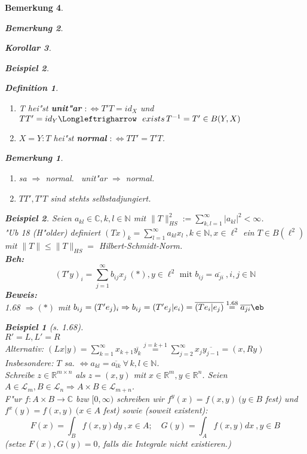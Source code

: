 \documentclass[a4paper,11pt]{book}
\newcommand{\R}{{\mathbb R}}
\newcommand{\C}{{\mathbb C}}
\newcommand{\N}{{\mathbb N}}
\newcommand{\ssL}{{\mathcal L}}
\newcommand{\begriff}[1]{\textbf{#1}} %
\newtheorem{Def}{Definition}[chapter]
\newtheorem{Kor}[Def]{Korollar}
\newtheorem*{BspNO}{Beispiel}
\newtheorem{Bsp}[Def]{Beispiel}
\newtheorem*{BemNO}{Bemerkung}
\newtheorem{Bem}[Def]{Bemerkung}
\theoremstyle{nonumberplain}
\begin{document}
\begin{Bem}
\begin{BemNO}
\begin{Kor}
\begin{BspNO}
\begin{enumerate}
\begin{Def}
\begin{enumerate}
\item[b)] T hei"st \begriff{unit"ar} $: \Longleftrightarrow T'T = id_X$ und $TT' = id_Y \Longleftrigharrow \ \ exists\, T^{-1} = T' \in B(Y,X)$

\item[c)] $X = Y: T$ hei"st \begriff{normal} $: \Longleftrightarrow TT' = T'T$.
\end{enumerate}
\end{Def}


\begin{BemNO}
\begin{enumerate}
\item sa $\Rightarrow$ normal. \ unit"ar $\Rightarrow$ normal.

\item $TT', T'T$ sind stehts selbstadjungiert.
\end{enumerate}
\end{BemNO}


\begin{Bsp}
Seien $a_{kl} \in \C, k,l \in \N$ mit $\|T\|_{HS}^2 := \sum_{k,l = 1}^{\infty} |a_{kl}|^2 < \infty$.\\
"Ub 18 (H"older) definiert $(Tx)_k = \sum_{l=1}^{\infty} a_{kl}x_l \ , k \in \N, x \in \ell^2$ ein $T \in B(\ell^2)$ mit $\|T\| \leq \|T\|_{HS} = $ Hilbert-Schmidt-Norm.\\
\textbf{Beh:}
\[
(T'y)_i = \sum_{j=1}^{\infty} b_{ij}x_j \ (\ast), y \in \ell^2 \text{  mit } b_{ij} = \overline{a_{ji}} \ ,i,j \in \N
\]
\textbf{Beweis:}\\
1.68 $\Rightarrow (\ast)$ mit $b_{ij} = (T'e_j)_i \Rightarrow b_{ij} = (T'e_j|e_i) = \overline{(Te_i|e_j)} \stackrel{1.68}{=} \overline{a_{ji}} \eb$
\end{Bsp}


\begin{BspNO}[s. 1.68]\\
$R' = L, L' = R$\\
Alternativ: $(Lx|y) = \sum_{k=1}^{\infty} x_{k+1} \overline{y_k} \stackrel{j=k+1}{=} \sum_{j=2}^{\infty} x_j \overline{y_{j-1}} = (x,Ry)$\\
Insbesondere: $T$ sa. $\Longleftrightarrow a_{kl} = \overline{a_{lk}} \ \forall\, k,l \in \N$.\\
Schreibe $z \in \R^{m \times n}$ als $z = (x,y)$ mit $x \in \R^m, y \in \R^n$. Seien $A \in \ssL_m, B \in \ssL_n \Rightarrow A \times B \in \ssL_{m+n}$.\\
F"ur $f: A \times B \rightarrow \C$ bzw $[0,\infty)$ schreiben wir $f^y(x) = f(x,y) \ (y \in B$ fest) und $f^x(y) = f(x,y) \ (x \in A$ fest) sowie (soweit existent):
\[
F(x) = \int_B f(x,y)dy \ , x \in A; \quad G(y) = \int_A f(x,y)dx \ , y \in B
\]
(setze $F(x),G(y) = 0$, falls die Integrale nicht existieren.)
\end{BspNO}




\end{enumerate}
\end{BspNO}
\end{Kor}
\end{BemNO}
\end{Bem}
\end{document}
